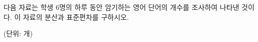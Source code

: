 다음 자료는 학생 6명의 하루 동안 암기하는 영어 단어의 개수를 조사하여 나타낸 것이다. 이 자료의 분산과 표준편차를 구하시오.\par\noindent\hfill{\footnotesize (단위: 개)}
